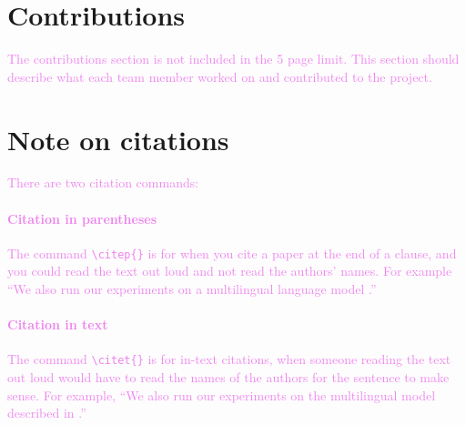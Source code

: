 \documentclass{article}
\newcommand{\instructions}[1]{\textcolor{violet}{{#1}}}
\begin{document}
\section{Contributions}
\instructions{%
The contributions section is not included in the 5 page limit. This section should describe what each team member worked on and contributed to the project.
}

\section{Note on citations}
\instructions{%
There are two citation commands:
}

\instructions{%
\paragraph{Citation in parentheses} The command \texttt{\textbackslash{}citep\{\}}  is for when you cite a paper at the end of a clause, and you could read the text out loud and not read the authors' names. For example ``We also run our experiments on a multilingual language model \citep{rajpurkar2018know}.'' 
}

\instructions{%
\paragraph{Citation in text} The command \texttt{\textbackslash{}citet\{\}} is for in-text citations, when someone reading the text out loud would have to read the names of the authors for the sentence to make sense. For example, ``We also run our experiments on the multilingual model described in \citet{rajpurkar2018know}.''
}



\end{document}
